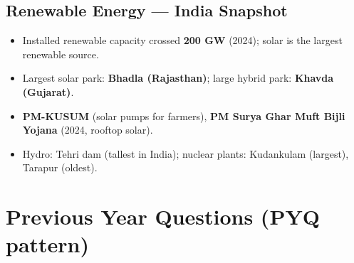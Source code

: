 \needspace{95pt}

\hypertarget{p1-09--75-renewable-energy--india-snapshot}{%
\subsection{Renewable Energy --- India Snapshot}\label{p1-09--75-renewable-energy--india-snapshot}}

\begin{itemize}
\tightlist
\item
  Installed renewable capacity crossed \textbf{200 GW} (2024); solar is the largest renewable source.
\item
  Largest solar park: \textbf{Bhadla (Rajasthan)}; large hybrid park: \textbf{Khavda (Gujarat)}.
\item
  \textbf{PM-KUSUM} (solar pumps for farmers), \textbf{PM Surya Ghar Muft Bijli Yojana} (2024, rooftop solar).
\item
  Hydro: Tehri dam (tallest in India); nuclear plants: Kudankulam (largest), Tarapur (oldest).
\end{itemize}

\needspace{95pt}

\hypertarget{p1-09--previous-year-questions-pyq-pattern}{%
\section{Previous Year Questions (PYQ pattern)}\label{p1-09--previous-year-questions-pyq-pattern}}


